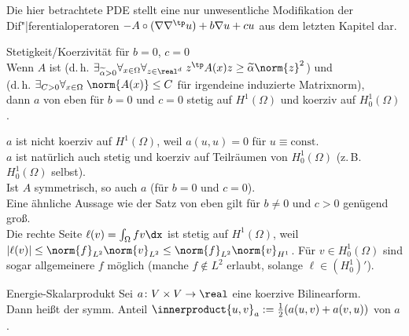 \begin{Bem}
    Die hier betrachtete PDE stellt eine nur unwesentliche Modifikation der
    Dif"|ferentialoperatoren $-A \circ (\nabla \nabla^\tp u) + b \nabla u + cu$
    aus dem letzten Kapitel dar.
\end{Bem}

\linie

\begin{Satz}{Stetigkeit/Koerzivität für $b = 0$, $c = 0$}\\
    Wenn $A$
     ist
    (d.\,h. $\exists_{\widetilde{\alpha} > 0} \forall_{x \in \Omega} \forall_{z \in \real^d}\;
    z^\tp A(x) z \ge \widetilde{\alpha} \norm{z}^2$) und\\
    (d.\,h. $\exists_{C > 0} \forall_{x \in \Omega}\; \norm{A(x)} \le C$ für irgendeine
    induzierte Matrixnorm),\\
    dann $a$ von eben für $b = 0$ und $c = 0$
    stetig auf $H^1(\Omega)$ und koerziv auf $H^1_0(\Omega)$.
\end{Satz}

\begin{Bem}
    $a$ ist nicht koerziv auf $H^1(\Omega)$,
    weil $a(u, u) = 0$ für $u \equiv \text{const}$.\\
    $a$ ist natürlich auch stetig und koerziv auf Teilräumen von $H^1_0(\Omega)$
    (z.\,B. $H^1_0(\Omega)$ selbst).\\
    Ist $A$ symmetrisch, so auch $a$ (für $b = 0$ und $c = 0$).\\
    Eine ähnliche Aussage wie der Satz von eben gilt für $b \not= 0$ und $c > 0$ genügend groß.\\
    Die rechte Seite $\ell(v) = \int_\Omega fv \dx$ ist stetig auf $H^1(\Omega)$,
    weil $|\ell(v)| \le \norm{f}_{L^2} \norm{v}_{L^2} \le \norm{f}_{L^2} \norm{v}_{H^1}$.
    Für $v \in H^1_0(\Omega)$ sind sogar allgemeinere $f$ möglich
    (manche $f \notin L^2$ erlaubt, solange $\ell \in (H^1_0)'$).
\end{Bem}

\linie

\begin{Def}{Energie-Skalarprodukt}
    Sei $a\colon V \times V \to \real$ eine koerzive Bilinearform.\\
    Dann heißt der symm. Anteil $\innerproduct{u, v}_a := \frac{1}{2} (a(u,v) + a(v,u))$
     von $a$.
\end{Def}


